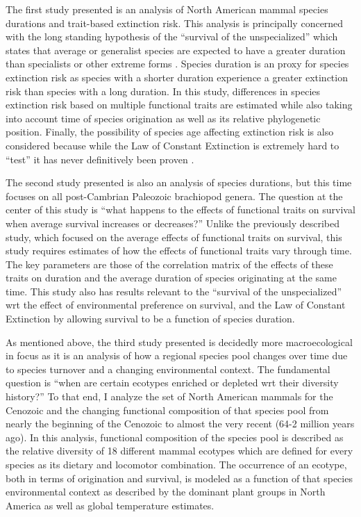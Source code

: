 The first study presented is an analysis of North American mammal species durations and trait-based extinction risk. This analysis is principally concerned with the long standing hypothesis of the ``survival of the unspecialized'' which states that average or generalist species are expected to have a greater duration than specialists or other extreme forms \citep{Simpson1944,Liow2004a,Liow2007b}. Species duration is an proxy for species extinction risk as species with a shorter duration experience a greater extinction risk than species with a long duration. In this study, differences in species extinction risk based on multiple functional traits are estimated while also taking into account time of species origination as well as its relative phylogenetic position. Finally, the possibility of species age affecting extinction risk is also considered because while the Law of Constant Extinction is extremely hard to ``test'' it has never definitively been proven \citep{VanValen1973,Liow2011a}.


The second study presented is also an analysis of species durations, but this time focuses on all post-Cambrian Paleozoic brachiopod genera. The question at the center of this study is ``what happens to the effects of functional traits on survival when average survival increases or decreases?'' Unlike the previously described study, which focused on the average effects of functional traits on survival, this study requires estimates of how the effects of functional traits vary through time. The key parameters are those of the correlation matrix of the effects of these traits on duration and the average duration of species originating at the same time. This study also has results relevant to the ``survival of the unspecialized'' wrt the effect of environmental preference on survival, and the Law of Constant Extinction by allowing survival to be a function of species duration.

As mentioned above, the third study presented is decidedly more macroecological in focus as it is an analysis of how a regional species pool changes over time due to species turnover and a changing environmental context. The fundamental question is ``when are certain ecotypes enriched or depleted wrt their diversity history?'' To that end, I analyze the set of North American mammals for the Cenozoic and the changing functional composition of that species pool from nearly the beginning of the Cenozoic to almost the very recent (64-2 million years ago). In this analysis, functional composition of the species pool is described as the relative diversity of 18 different mammal ecotypes which are defined for every species as its dietary and locomotor combination. The occurrence of an ecotype, both in terms of origination and survival, is modeled as a function of that species environmental context as described by the dominant plant groups in North America as well as global temperature estimates.

